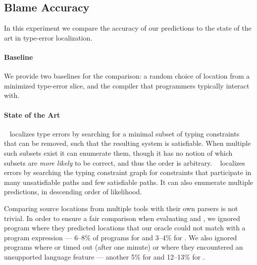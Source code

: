 \subsection{Blame Accuracy}
\label{sec:quantitative}

In this experiment we compare the accuracy of our predictions to the
state of the art in type-error localization.

\paragraph{Baseline}
We provide two baselines for the comparison: a random choice of location
from a minimized type-error slice, and the \ocaml compiler that
programmers typically interact with.

\paragraph{State of the Art}
\mycroft~\citep{Loncaric2016-uk} localizes type errors by searching for
a minimal subset of typing constraints that can be removed, such that
the resulting system is satisfiable.
%
When multiple such subsets exist it can enumerate them, though it has no
notion of which subsets are \emph{more likely} to be correct, and thus
the order is arbitrary.
%
\sherrloc~\citep{Zhang2014-lv} localizes errors by searching the typing
constraint graph for constraints that participate in many unsatisfiable
paths and few satisfiable paths.
%
It can also enumerate multiple predictions, in descending order of
likelihood.

Comparing source locations from multiple tools with their own parsers is
not trivial.
%
In order to ensure a fair comparison when evaluating \mycroft and
\sherrloc, we ignored program where they predicted locations that our
oracle could not match with a program expression --- 6--8\% of programs
for \mycroft and 3--4\% for \sherrloc.
%
We also ignored programs where \mycroft or \sherrloc timed out (after
one minute) or where they encountered an unsupported language feature ---
another 5\% for \mycroft and 12--13\% for \sherrloc.


